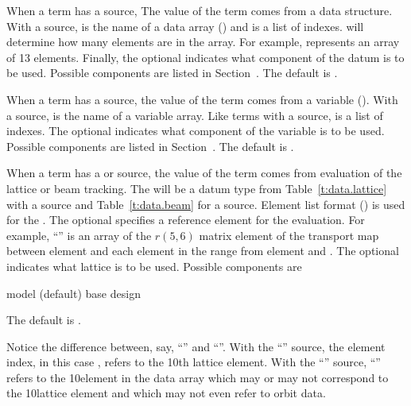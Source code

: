 When a term has a  source, The value of the term comes from a 
data structure. With a  source,  is the name
of a  data array () and 
 is a list of indexes.  will determine
how many elements are in the array. For example,  
represents an array of 13 elements. Finally, the optional 
indicates what component of the datum is to be used. Possible components are
listed in Section~. The default is .

When a term has a  source, the value of the term comes from a
\tao variable (). With a  source,
 is the name of a  variable array. Like
terms with a  source,  is a list of indexes.
The optional  indicates what component of the variable
is to be used. Possible components are listed in Section~.
The default is .


When a term has a  or  source, the value of the term
comes from evaluation of the lattice or beam tracking. The
 will be a datum type from Table~\ref{t:data.lattice}
with a  source and Table~\ref{t:data.beam} for a 
source. Element list format () is used for the
. The optional  specifies a reference
element for the evaluation. For example, ``'' is
an array of the $r(5,6)$ matrix element of the transport map between
element  and each element in the range from element  and 
. The optional  indicates what lattice 
is to be used. Possible components are 
\begin{example}
  model (default)
  base
  design
\end{example}
The default is .

Notice the difference between, say, ``'' and
``''. With the ``'' source, the element 
index, in this case , refers to the 10th lattice element. With the
``'' source, ``'' refers to the 10\Th element in
the  data array which may or may not correspond to the
10\Th lattice element and which may not even refer to orbit data.

